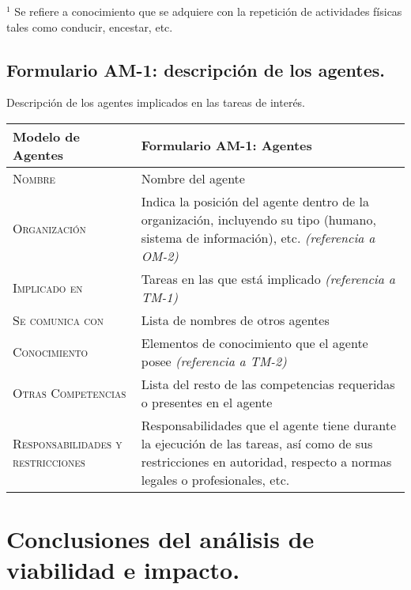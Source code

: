 \documentclass[12pt,a4paper,twoside,spanish]{article}      %
\begin{document}
{\scriptsize \noindent $^1$ Se refiere a conocimiento que se
adquiere con la repetición de actividades físicas tales como
conducir, encestar, etc.}

\pagebreak
\subsection{Formulario AM-1: descripción de los agentes.}

{\color{blue} Descripción de los agentes implicados en las tareas de interés.}

\begin{table}[H]
\scriptsize
\begin{tabularx}{\textwidth}{|l|X|} \hline
\textbf{Modelo de Agentes} & \textbf{Formulario AM-1: Agentes} \\ \hline\hline
\textsc{Nombre} &  Nombre del agente \\ \hline
\textsc{Organización} &  Indica la posición del agente dentro de la organización, incluyendo su tipo (humano, sistema de información), etc. \emph{(referencia a OM-2)}\\ \hline
\textsc{Implicado en} & Tareas en las que está implicado \emph{(referencia a TM-1)} \\ \hline
\textsc{Se comunica con} &  Lista de nombres de otros agentes  \\ \hline
\textsc{Conocimiento} &  Elementos de conocimiento que el agente posee \emph{(referencia a TM-2)} \\ \hline
\textsc{Otras Competencias} &  Lista del resto de las competencias requeridas o presentes en el agente \\ \hline
\textsc{Responsabilidades y restricciones} &  Responsabilidades que el agente tiene durante la ejecución de las
tareas, así como de sus restricciones en autoridad, respecto a normas legales o
profesionales, etc.\\ \hline
\end{tabularx}
 \label{tab.AM1}
\end{table}


\pagebreak
\section{Conclusiones del análisis de viabilidad e impacto.}
\end{document}
